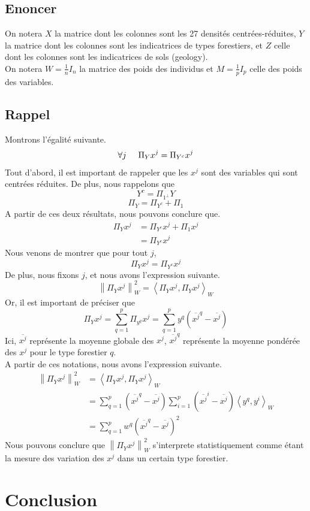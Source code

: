 \documentclass{article}
\begin{document}
\subsection{Enoncer}
On notera $X$ la matrice dont les colonnes sont les 27 densités centrées-réduites, $Y$ la
matrice dont les colonnes sont les indicatrices de types forestiers, et $Z$ celle dont les
colonnes sont les indicatrices de sols (geology). \\
On notera $W=\frac{1}{n}I_n$ la matrice des poids des individus et $M=\frac{1}{p}I_p$
celle des poids des variables.
\subsection{Rappel}
Montrons l'égalité suivante. \\
\[
\forall j \hspace{0.5cm} \Pi_Y x^j = \Pi_{Y^c} x^j
\]
Tout d'abord, il est important de rappeler que les $x^j$ sont des variables qui sont
centrées réduites. De plus, nous rappelons que 
\[
Y^c = \Pi_{1^\perp} Y 
\]
\[
\Pi_Y = \Pi_{Y^c} + \Pi_1
\]
A partir de ces deux résultats, nous pouvons conclure que. \\
\begin{align*}
    \Pi_Y x^j & = \Pi_{Y^c} x^j + \Pi_1 x^j \\
    &= \Pi_{Y^c} x^j
\end{align*}
Nous venons de montrer que pour tout $j$, 
\[
\Pi_Y x^j = \Pi_{Y^c} x^j
\]
De plus, nous fixons $j$, et nous avons l'expression suivante.
\[
\left\lVert \Pi_Y x^j \right\rVert^2 _W = \left\langle \Pi_Y x^j,\Pi_Y x^j\right\rangle_W
\]
Or, il est important de préciser que
\[
\Pi_Y x^j=\sum_{q = 1}^{p}\Pi_{y^q} x^j=\sum_{q = 1}^{p}y^q( \overline{x^j}^q - {\overline{x^j}} )  
\]
Ici, $\overline{x^j}$ représente la moyenne globale des $x^j$, $\overline{x^j}^q$ représente la moyenne pondérée des $x^j$ pour le type forestier $q$.\\
A partir de ces notations, nous avons l'expression suivante.
\begin{align*}
    \left\lVert \Pi_Y x^j \right\rVert^2 _W &= \left\langle \Pi_Y x^j,\Pi_Y x^j\right\rangle_W \\
     &=  \sum_{q = 1}^{p}( \overline{x^j}^q - {\overline{x^j}} ) \sum_{ i= 1}^{p}( \overline{x^j}^i - {\overline{x^j}} )\left\langle y^q,y^i\right\rangle_W \\
     &= \sum_{q = 1}^{p}w^q( \overline{x^j}^q - {\overline{x^j}} )^2
\end{align*}
Nous pouvons conclure que $\left\lVert \Pi_Y x^j \right\rVert^2 _W$ s'interprete statistiquement comme
étant la mesure des variation des $x^j$ dans un certain type forestier.
\newpage
\section{Conclusion}
\end{document}
